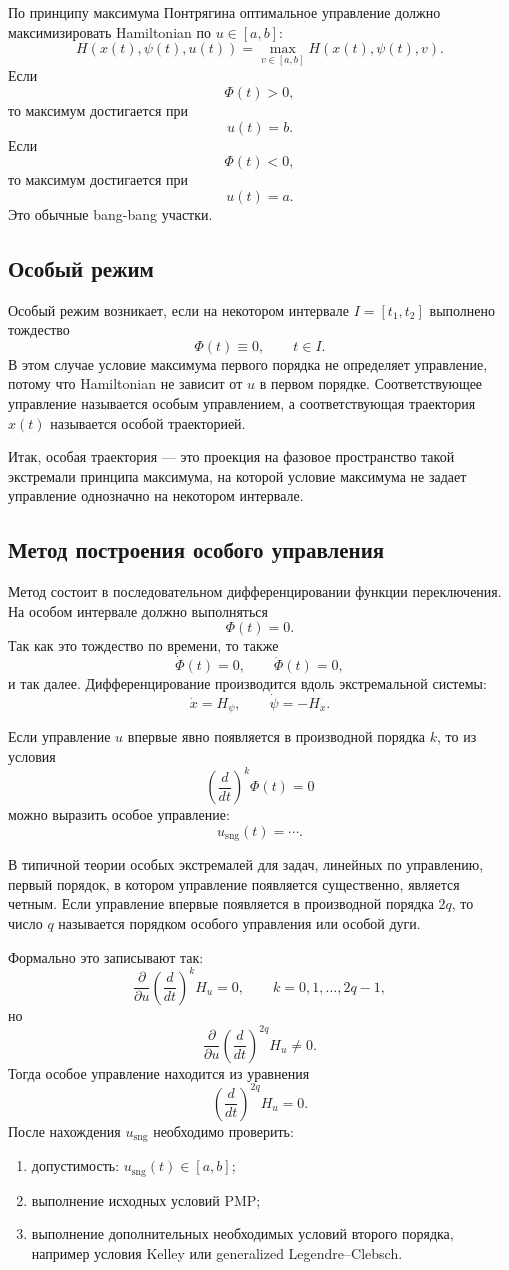 \documentclass[12pt,a4paper]{article}
\newcommand{\sng}{\mathrm{sng}}
\begin{document}
По принципу максимума Понтрягина оптимальное управление должно максимизировать Hamiltonian по $u\in[a,b]$:
\[
H(x(t),\psi(t),u(t))=
\max_{v\in[a,b]}H(x(t),\psi(t),v).
\]
Если
\[
\Phi(t)>0,
\]
то максимум достигается при
\[
u(t)=b.
\]
Если
\[
\Phi(t)<0,
\]
то максимум достигается при
\[
u(t)=a.
\]
Это обычные bang-bang участки.

\subsection*{Особый режим}
Особый режим возникает, если на некотором интервале $I=[t_1,t_2]$ выполнено тождество
\[
\Phi(t)\equiv0,
\qquad t\in I.
\]
В этом случае условие максимума первого порядка не определяет управление, потому что Hamiltonian не зависит от $u$ в первом порядке. Соответствующее управление называется особым управлением, а соответствующая траектория $x(t)$ называется особой траекторией.

Итак, особая траектория --- это проекция на фазовое пространство такой экстремали принципа максимума, на которой условие максимума не задает управление однозначно на некотором интервале.

\subsection*{Метод построения особого управления}
Метод состоит в последовательном дифференцировании функции переключения. На особом интервале должно выполняться
\[
\Phi(t)=0.
\]
Так как это тождество по времени, то также
\[
\dot\Phi(t)=0,\qquad \ddot\Phi(t)=0,
\]
и так далее. Дифференцирование производится вдоль экстремальной системы:
\[
\dot x=H_\psi,
\qquad
\dot\psi=-H_x.
\]

Если управление $u$ впервые явно появляется в производной порядка $k$, то из условия
\[
\left(\frac{d}{dt}\right)^k\Phi(t)=0
\]
можно выразить особое управление:
\[
u_{\sng}(t)=\cdots.
\]

В типичной теории особых экстремалей для задач, линейных по управлению, первый порядок, в котором управление появляется существенно, является четным. Если управление впервые появляется в производной порядка $2q$, то число $q$ называется порядком особого управления или особой дуги.

Формально это записывают так:
\[
\frac{\partial}{\partial u}
\left(\frac{d}{dt}\right)^k H_u=0,
\qquad k=0,1,\ldots,2q-1,
\]
но
\[
\frac{\partial}{\partial u}
\left(\frac{d}{dt}\right)^{2q}H_u\ne0.
\]
Тогда особое управление находится из уравнения
\[
\left(\frac{d}{dt}\right)^{2q}H_u=0.
\]
После нахождения $u_{\sng}$ необходимо проверить:
\begin{enumerate}
    \item допустимость: $u_{\sng}(t)\in[a,b]$;
    \item выполнение исходных условий PMP;
    \item выполнение дополнительных необходимых условий второго порядка, например условия Kelley или generalized Legendre--Clebsch.
\end{enumerate}
\end{document}
